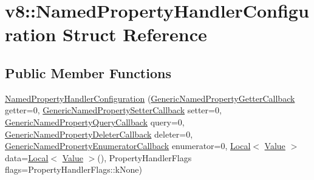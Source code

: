 \hypertarget{structv8_1_1NamedPropertyHandlerConfiguration}{}\section{v8\+:\+:Named\+Property\+Handler\+Configuration Struct Reference}
\label{structv8_1_1NamedPropertyHandlerConfiguration}
\subsection*{Public Member Functions}
\begin{DoxyCompactItemize}
\item 
\hyperlink{structv8_1_1NamedPropertyHandlerConfiguration_a7304ee88edae7f7342f3a03f7974202d}{Named\+Property\+Handler\+Configuration} (\hyperlink{namespacev8_a24b1801fa53a7c5a71366d8044927563}{Generic\+Named\+Property\+Getter\+Callback} getter=0, \hyperlink{namespacev8_af74716c6e95a269c6cd4314662fd0a7e}{Generic\+Named\+Property\+Setter\+Callback} setter=0, \hyperlink{namespacev8_add9f7ab11e4a9a2b9ad2c4536b0e1a64}{Generic\+Named\+Property\+Query\+Callback} query=0, \hyperlink{namespacev8_ad2aecc0406ea4bc02d5a4f84a433b273}{Generic\+Named\+Property\+Deleter\+Callback} deleter=0, \hyperlink{namespacev8_a20826eb7e52e84fa4f632534e8eddd04}{Generic\+Named\+Property\+Enumerator\+Callback} enumerator=0, \hyperlink{classv8_1_1Local}{Local}$<$ \hyperlink{classv8_1_1Value}{Value} $>$ data=\hyperlink{classv8_1_1Local}{Local}$<$ \hyperlink{classv8_1_1Value}{Value} $>$(), Property\+Handler\+Flags flags=Property\+Handler\+Flags\+::k\+None)
\end{DoxyCompactItemize}
